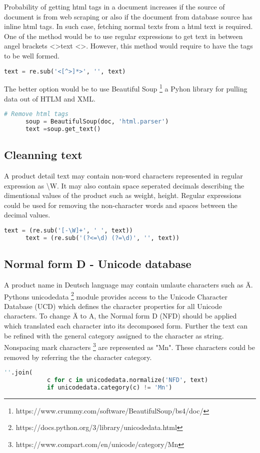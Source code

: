 Probability of getting html tags in a document increases if the source of document is from web scraping or also if the document from database source has inline html tags. In such case, fetching normal texts from a html text is required. One of the method would be to use regular expressions to get text in between angel brackets \textless \textgreater text \textless \textgreater. However, this method would require to have the tags to be well formed.
\begin{lstlisting}[language=Python]
      text = re.sub('<[^>]*>', '', text)
\end{lstlisting}



The better option would be to use Beautiful Soup \footnote{https://www.crummy.com/software/BeautifulSoup/bs4/doc/} a Pyhon library for pulling data out of HTLM and XML.
\begin{lstlisting}[language=Python]
      # Remove html tags 
      soup = BeautifulSoup(doc, 'html.parser')
      text =soup.get_text()
\end{lstlisting}

\subsection{Cleanning text}

A product detail text may contain non-word characters represented in regular expression as \textbackslash W. It may also contain space seperated decimals describing the dimentional values of the product such as weight, height. Regular expressions could be used for removing the non-character words and spaces between the decimal values. 

\begin{lstlisting}[language=Python]
      text = (re.sub('[-\W]+', ' ', text))
      text = (re.sub('(?<=\d) (?=\d)', '', text))
\end{lstlisting}

\subsection{Normal form D - Unicode database}

A product name in Deutsch language may contain umlaute characters such as \"A.  Pythons unicodedata \footnote{https://docs.python.org/3/library/unicodedata.html} module provides access to the Unicode Character Database (UCD) which defines the character properties for all Unicode characters. To change \"A to A, the Normal form D (NFD) should be applied which translated each character into its decomposed form. Further the text can be refined with the general category assigned to the character as string. Nonspacing mark characters \footnote{https://www.compart.com/en/unicode/category/Mn} are represented as "Mn". These characters could be removed by referring the the character category.
\begin{lstlisting}[language=Python]
      ''.join(
            c for c in unicodedata.normalize('NFD', text)
            if unicodedata.category(c) != 'Mn')
\end{lstlisting}
